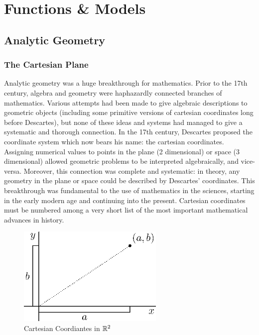 \documentclass[fleqn]{report}
\begin{document}
\chapter{Functions \& Models}
\label{functions-and-models}

\section{Analytic Geometry}
\label{analytic-geometry}

\subsection{The Cartesian Plane}
\label{cartesian-plane}

Analytic geometry was a huge breakthrough for
mathematics. Prior to the 17th century, algebra and geometry
were haphazardly connected branches of mathematics. Various
attempts had been made to give algebraic descriptions to
geometric objects (including some primitive versions of
cartesian coordinates long before Descartes), but none of
these ideas and systems had managed to give a systematic and
thorough connection. In the 17th century,
Descartes proposed the coordinate system which now bears his name:
the cartesian coordinates. Assigning numerical values to
points in the plane (2 dimensional) or space (3 dimensional)
allowed geometric problems to be interpreted algebraically, and
vice-versa. Moreover, this connection was complete and
systematic: in theory, any geometry in the plane or space
could be described by Descartes' coordinates. This
breakthrough was fundamental to the use of mathematics in
the sciences, starting in the early modern age and continuing
into the present. Cartesian coordinates must be numbered
among a very short list of the most important mathematical
advances in history.

\begin{figure}[t]
\centering
\includegraphics[width=7cm]{figure01.eps}
\caption{Cartesian Coordiantes in $\mathbb{R}^2$}
\label{figure-cartesian-coordiantes}
\end{figure}
\end{document}
